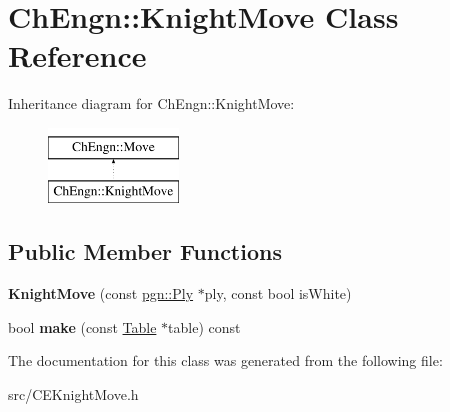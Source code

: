 \hypertarget{classChEngn_1_1KnightMove}{
\section{ChEngn::KnightMove Class Reference}
\label{classChEngn_1_1KnightMove}
}
Inheritance diagram for ChEngn::KnightMove:\begin{figure}[H]
\begin{center}
\leavevmode
\includegraphics[height=2.000000cm]{classChEngn_1_1KnightMove}
\end{center}
\end{figure}
\subsection*{Public Member Functions}
\begin{DoxyCompactItemize}
\item 
\hypertarget{classChEngn_1_1KnightMove_a1c263dc594e85e4903542c21f5b8d5be}{
{\bfseries KnightMove} (const \hyperlink{classpgn_1_1Ply}{pgn::Ply} $\ast$ply, const bool isWhite)}
\label{classChEngn_1_1KnightMove_a1c263dc594e85e4903542c21f5b8d5be}

\item 
\hypertarget{classChEngn_1_1KnightMove_a4a27bc351e3224ffd96d099dc0613475}{
bool {\bfseries make} (const \hyperlink{classChEngn_1_1Table}{Table} $\ast$table) const }
\label{classChEngn_1_1KnightMove_a4a27bc351e3224ffd96d099dc0613475}

\end{DoxyCompactItemize}


The documentation for this class was generated from the following file:\begin{DoxyCompactItemize}
\item 
src/CEKnightMove.h\end{DoxyCompactItemize}
